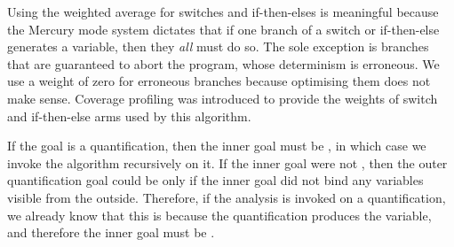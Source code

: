 Using the weighted average for switches and if-then-elses is meaningful because
the Mercury mode system dictates
that if one branch of a switch or if-then-else generates a variable,
then they \emph{all} must do so.
The sole exception is branches that are guaranteed to abort the program,
whose determinism is erroneous.
We use a weight of zero for erroneous branches 
because optimising them does not make sense.
Coverage profiling was introduced to provide the weights of switch and
if-then-else arms used by this algorithm.

If the goal is a quantification,
then the inner goal must be \ddet,
in which case we invoke the algorithm recursively on it.
If the inner goal were not \ddet,
then the outer quantification goal could be \ddet
only if the inner goal did not bind any variables visible from the outside.
Therefore, if the analysis is invoked on a quantification,
we already know that this is because the quantification produces the
variable, and therefore the inner goal must be \ddet.

